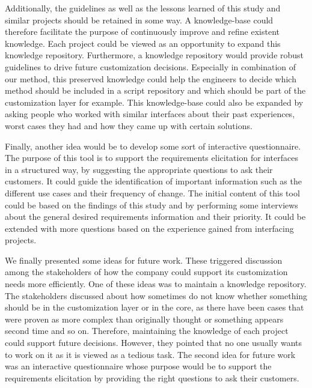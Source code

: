 Additionally, the guidelines as well as the lessons learned of this study and similar projects should be retained in some way. A knowledge-base could therefore facilitate the purpose of continuously improve and refine existent knowledge. Each project could be viewed as an opportunity to expand this knowledge repository. Furthermore, a knowledge repository would provide robust guidelines to drive future customization decisions. Especially in combination of our method, this preserved knowledge could help the engineers to decide which method should be included in a script repository and which should be part of the customization layer for example. This knowledge-base could also be expanded by asking people who worked with similar interfaces about their past experiences, worst cases they had and how they came up with certain solutions. 



Finally, another idea would be to develop some sort of interactive questionnaire. The purpose of this tool is to support the requirements elicitation for interfaces in a structured way, by suggesting the appropriate questions to ask their customers. It could guide the identification of important information such as the different use cases and their frequency of change. The initial content of this tool could be based on the findings of this study and by performing some interviews about the general desired requirements information and their priority. It could be extended with more questions based on the experience gained from interfacing projects.

We finally presented some ideas for future work. These triggered discussion among the stakeholders of how the company could support its customization needs more efficiently. One of these ideas was to maintain a knowledge repository. The stakeholders discussed about how sometimes do not know whether something should be in the customization layer or in the core, as there have been cases that were proven as more complex than originally thought or something appears second time and so on. Therefore, maintaining the knowledge of each project could support future decisions. However, they pointed that no one usually wants to work on it as it is viewed as a tedious task. The second idea for future work was an interactive questionnaire whose purpose would be to support the requirements elicitation by providing the right questions to ask their customers.


